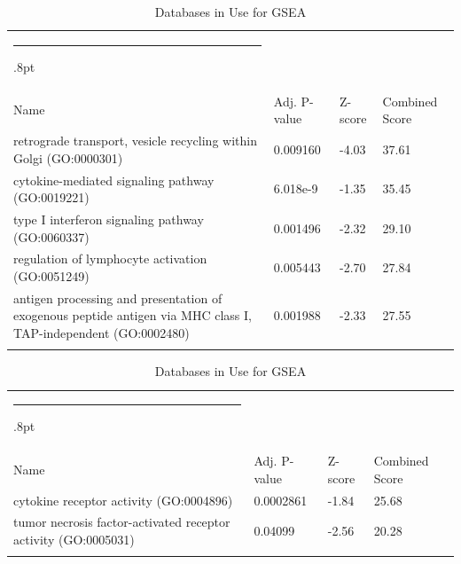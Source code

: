 \documentclass[3p,authoryear,preprint,12pt]{elsarticle}
\makeatletter
\def\hlinewd#1{%
  \noalign{\ifnum0=`}\fi\hrule \@height #1%
  \futurelet\reserved@a\@xhline}
\def\tbltoprule{\hlinewd{.8pt}\\[-12pt]}
\def\tblbottomrule{\noalign{\vspace*{6pt}}\hline\noalign{\vspace*{2pt}}}
\def\tblmidrule{\noalign{\vspace*{6pt}}\hline\noalign{\vspace*{2pt}}}
\makeatother
\begin{document}
\begin{table}[!htbp]
	\caption{{Databases in Use for GSEA} }
	\label{tw-de478ae31cc6}
	\def\arraystretch{1}
	\ignorespaces 
	\centering 
	\begin{tabulary}{\linewidth}{p{\dimexpr.65\tabcolsep}p{\dimexpr.15\tabcolsep}p{\dimexpr.1\tabcolsep}p{\dimexpr.1\tabcolsep}}
		\tbltoprule Name & Adj. P-value & Z-score & Combined Score\\
		\tblmidrule
retrograde transport, vesicle recycling within Golgi (GO:0000301) & 0.009160 & -4.03 & 37.61 \\
cytokine-mediated signaling pathway (GO:0019221) & 6.018e-9 & -1.35 & 35.45 \\
type I interferon signaling pathway (GO:0060337) & 0.001496 & -2.32 & 29.10 \\
regulation of lymphocyte activation (GO:0051249) & 0.005443 & -2.70 & 27.84 \\
antigen processing and presentation of exogenous peptide antigen via MHC class I, TAP-independent (GO:0002480) & 0.001988 & -2.33 & 27.55 \\
		\tblbottomrule
	\end{tabulary}\par 
\end{table}
\begin{table}[!htbp]
	\caption{{Databases in Use for GSEA} }
	\label{tw-de478ae31cc6}
	\def\arraystretch{1}
	\ignorespaces 
	\centering 
	\begin{tabulary}{\linewidth}{p{\dimexpr.65\tabcolsep}p{\dimexpr.15\tabcolsep}p{\dimexpr.1\tabcolsep}p{\dimexpr.1\tabcolsep}}
		\tbltoprule Name & Adj. P-value & Z-score & Combined Score\\
		\tblmidrule
cytokine receptor activity (GO:0004896) & 0.0002861 & -1.84 & 25.68 \\
tumor necrosis factor-activated receptor activity (GO:0005031) & 0.04099 & -2.56 & 20.28 \\
		\tblbottomrule
	\end{tabulary}\par 
\end{table}
\end{document}
